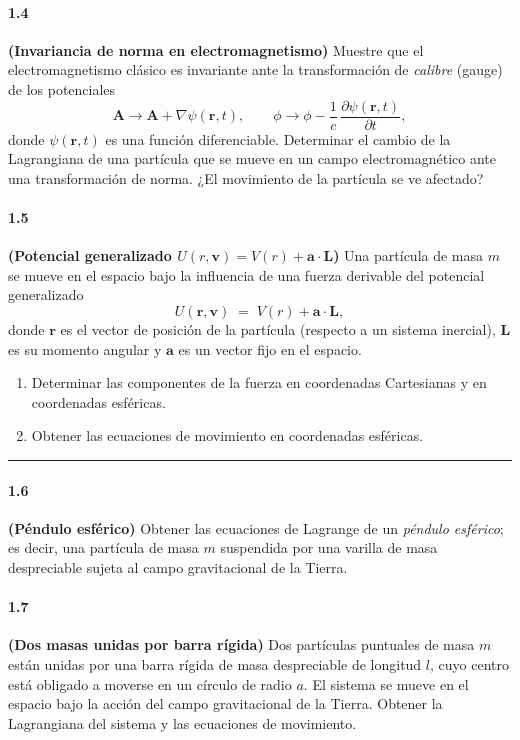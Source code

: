 \documentclass[12pt]{article}
\begin{document}
\paragraph{1.4}\textbf{(Invariancia de norma en electromagnetismo)}\;
Muestre que el electromagnetismo clásico es invariante ante la transformación de \emph{calibre} (gauge) de los potenciales
\begin{equation}
\label{eq:gauge}
\mathbf A \to \mathbf A + \nabla \psi(\mathbf r,t),
\qquad
\phi \to \phi - \frac{1}{c}\,\frac{\partial \psi(\mathbf r,t)}{\partial t},
\end{equation}
donde $\psi(\mathbf r,t)$ es una función diferenciable.
Determinar el cambio de la Lagrangiana de una partícula que se mueve en un campo electromagnético ante una transformación de norma. 
¿El movimiento de la partícula se ve afectado?

\paragraph{1.5}\textbf{(Potencial generalizado $U(r,\mathbf v)=V(r)+\mathbf a\cdot\mathbf L$)}\;
Una partícula de masa $m$ se mueve en el espacio bajo la influencia de una fuerza derivable del potencial generalizado
\begin{equation}
U(\mathbf r,\mathbf v) \;=\; V(r) + \mathbf a \cdot \mathbf L,
\end{equation}
donde $\mathbf r$ es el vector de posición de la partícula (respecto a un sistema inercial), $\mathbf L$ es su momento angular y $\mathbf a$ es un vector fijo en el espacio.
\begin{enumerate}[label=(\alph*)]
\item Determinar las componentes de la fuerza en coordenadas Cartesianas y en coordenadas esféricas.
\item Obtener las ecuaciones de movimiento en coordenadas esféricas.
\end{enumerate}

\bigskip
\hrule
\bigskip

\paragraph{1.6}\textbf{(Péndulo esférico)}\;
Obtener las ecuaciones de Lagrange de un \emph{péndulo esférico}; es decir, una partícula de masa $m$ suspendida por una varilla de masa despreciable sujeta al campo gravitacional de la Tierra.

\paragraph{1.7}\textbf{(Dos masas unidas por barra rígida)}\;
Dos partículas puntuales de masa $m$ están unidas por una barra rígida de masa despreciable de longitud $l$, cuyo centro está obligado a moverse en un círculo de radio $a$. El sistema se mueve en el espacio bajo la acción del campo gravitacional de la Tierra.
Obtener la Lagrangiana del sistema y las ecuaciones de movimiento.
\end{document}
